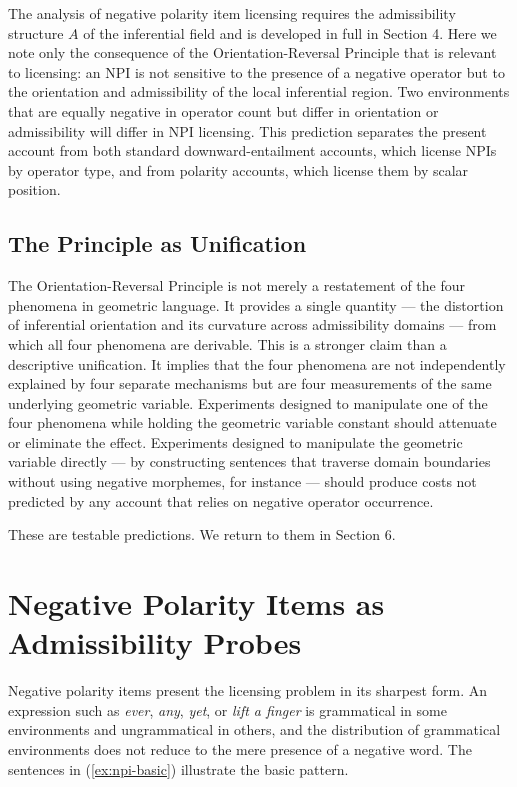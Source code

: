 \documentclass[12pt]{article}
\theoremstyle{remark}
\begin{document}
The analysis of negative polarity item licensing requires the admissibility
structure $A$ of the inferential field and is developed in full in Section
4. Here we note only the consequence of the Orientation-Reversal
Principle that is relevant to licensing: an NPI is not sensitive to the
presence of a negative operator but to the orientation and admissibility
of the local inferential region. Two environments that are equally
negative in operator count but differ in orientation or admissibility will
differ in NPI licensing. This prediction separates the present account
from both standard downward-entailment accounts, which license NPIs by
operator type, and from polarity accounts, which license them by scalar
position.

\subsection{The Principle as Unification}

The Orientation-Reversal Principle is not merely a restatement of the
four phenomena in geometric language. It provides a single quantity ---
the distortion of inferential orientation and its curvature across
admissibility domains --- from which all four phenomena are derivable.
This is a stronger claim than a descriptive unification. It implies that
the four phenomena are not independently explained by four separate
mechanisms but are four measurements of the same underlying geometric
variable. Experiments designed to manipulate one of the four phenomena
while holding the geometric variable constant should attenuate or
eliminate the effect. Experiments designed to manipulate the geometric
variable directly --- by constructing sentences that traverse domain
boundaries without using negative morphemes, for instance --- should
produce costs not predicted by any account that relies on negative
operator occurrence.

These are testable predictions. We return to them in Section 6.

\section{Negative Polarity Items as Admissibility Probes}

Negative polarity items present the licensing problem in its sharpest
form. An expression such as \emph{ever}, \emph{any}, \emph{yet}, or
\emph{lift a finger} is grammatical in some environments and
ungrammatical in others, and the distribution of grammatical environments
does not reduce to the mere presence of a negative word. The sentences in
(\ref{ex:npi-basic}) illustrate the basic pattern.
\end{document}
